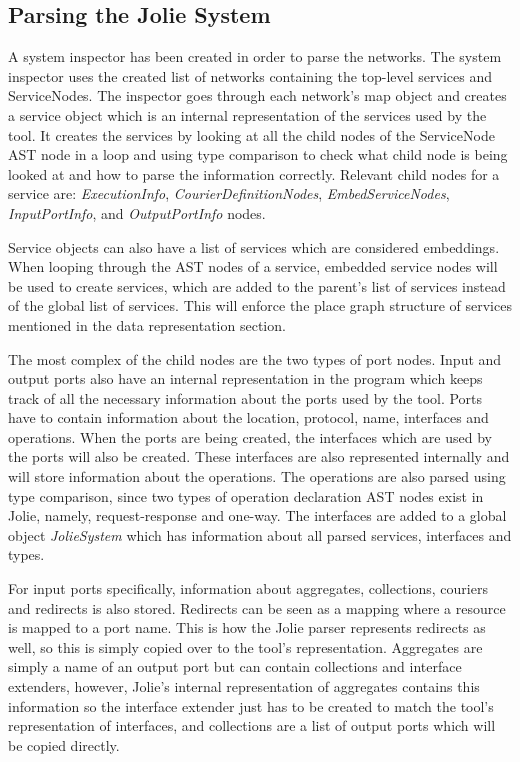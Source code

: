 \subsection{Parsing the Jolie System}
A system inspector has been created in order to parse the networks.
The system inspector uses the created list of networks containing the top-level services and ServiceNodes.
The inspector goes through each network's map object and creates a service object which is an internal representation of the services used by the tool.
It creates the services by looking at all the child nodes of the ServiceNode AST node in a loop and using type comparison to check what child node is being looked at and how to parse the information correctly.
Relevant child nodes for a service are: \emph{ExecutionInfo}, \emph{CourierDefinitionNodes}, \emph{EmbedServiceNodes}, \emph{InputPortInfo}, and \emph{OutputPortInfo} nodes.

Service objects can also have a list of services which are considered embeddings. When looping through the AST nodes of a service, embedded service nodes will be used to create services, which are added to the parent's list of services instead of the global list of services.
This will enforce the place graph structure of services mentioned in the data representation section.

The most complex of the child nodes are the two types of port nodes. Input and output ports also have an internal representation in the \javatoolname[] program which keeps track of all the necessary information about the ports used by the tool.
Ports have to contain information about the location, protocol, name, interfaces and operations.
When the ports are being created, the interfaces which are used by the ports will also be created. These interfaces are also represented internally and will store information about the operations.
The operations are also parsed using type comparison, since two types of operation declaration AST nodes exist in Jolie, namely, request-response and one-way.
The interfaces are added to a global object \emph{JolieSystem} which has information about all parsed services, interfaces and types.

For input ports specifically, information about aggregates, collections, couriers and redirects is also stored. Redirects can be seen as a mapping where a resource is mapped to a port name. This is how the Jolie parser represents redirects as well, so this is simply copied over to the tool's representation.
Aggregates are simply a name of an output port but can contain collections and interface extenders, however, Jolie's internal representation of aggregates contains this information so the interface extender just has to be created to match the tool's representation of interfaces, and collections are a list of output ports which will be copied directly.

